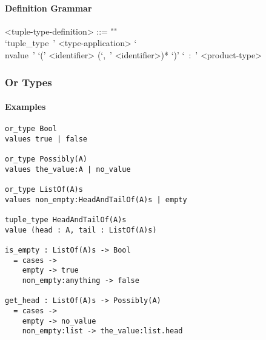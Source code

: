 \documentclass{article}
\begin{document}
\paragraph{Definition Grammar}
\begin{grammar}
<tuple-type-definition> ::= ""\\
`tuple_type\ ' <type-application>
`\\nvalue\ ' `(' <identifier> (`,\ ' <identifier>)* `)' `\ :\ ' <product-type>
\end{grammar}

\subsubsection{Or Types}

\paragraph{Examples}

\begin{verbatim}
or_type Bool
values true | false

or_type Possibly(A)
values the_value:A | no_value

or_type ListOf(A)s
values non_empty:HeadAndTailOf(A)s | empty

tuple_type HeadAndTailOf(A)s
value (head : A, tail : ListOf(A)s)

is_empty : ListOf(A)s -> Bool
  = cases -> 
    empty -> true
    non_empty:anything -> false

get_head : ListOf(A)s -> Possibly(A)
  = cases -> 
    empty -> no_value
    non_empty:list -> the_value:list.head
\end{verbatim}
\end{document}
